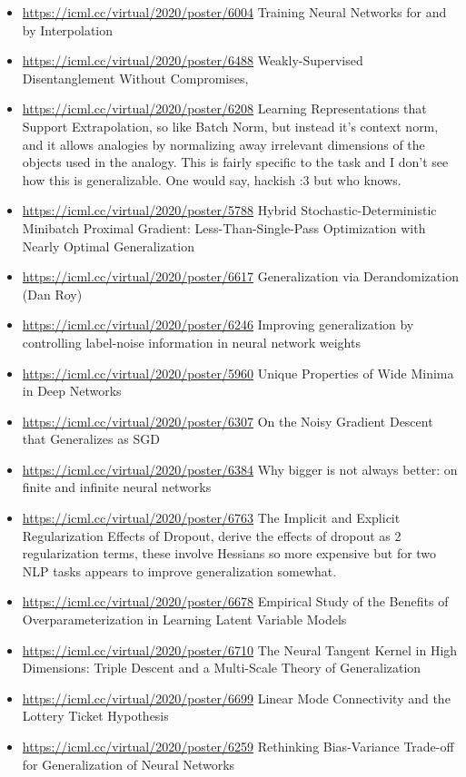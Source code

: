 \begin{itemize}
\item \url{https://icml.cc/virtual/2020/poster/6004}  Training Neural Networks for and by Interpolation
\item \url{https://icml.cc/virtual/2020/poster/6488}  Weakly-Supervised Disentanglement Without Compromises,
\item \url{https://icml.cc/virtual/2020/poster/6208}  Learning Representations that Support Extrapolation, so like Batch Norm, but instead it’s context norm, and it allows analogies by normalizing away irrelevant dimensions of the objects used in the analogy. This is fairly specific to the task and I don’t see how this is generalizable. One would say, hackish :3 but who knows.
\item \url{https://icml.cc/virtual/2020/poster/5788}  Hybrid Stochastic-Deterministic Minibatch Proximal Gradient: Less-Than-Single-Pass Optimization with Nearly Optimal Generalization
\item \url{https://icml.cc/virtual/2020/poster/6617}  Generalization via Derandomization (Dan Roy)
\item \url{https://icml.cc/virtual/2020/poster/6246}  Improving generalization by controlling label-noise information in neural network weights
\item \url{https://icml.cc/virtual/2020/poster/5960}  Unique Properties of Wide Minima in Deep Networks
\item \url{https://icml.cc/virtual/2020/poster/6307}  On the Noisy Gradient Descent that Generalizes as SGD
\item \url{https://icml.cc/virtual/2020/poster/6384}  Why bigger is not always better: on finite and infinite neural networks
\item \url{https://icml.cc/virtual/2020/poster/6763}  The Implicit and Explicit Regularization Effects of Dropout, derive the effects of dropout as 2 regularization terms, these involve Hessians so more expensive but for two NLP tasks appears to improve generalization somewhat.
\item \url{https://icml.cc/virtual/2020/poster/6678}  Empirical Study of the Benefits of Overparameterization in Learning Latent Variable Models
\item \url{https://icml.cc/virtual/2020/poster/6710}  The Neural Tangent Kernel in High Dimensions: Triple Descent and a Multi-Scale Theory of Generalization
\item \url{https://icml.cc/virtual/2020/poster/6699}  Linear Mode Connectivity and the Lottery Ticket Hypothesis
\item \url{https://icml.cc/virtual/2020/poster/6259}  Rethinking Bias-Variance Trade-off for Generalization of Neural Networks

\end{itemize}
